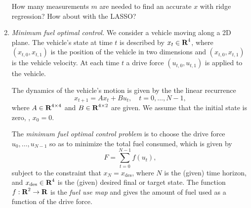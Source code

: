 \documentclass[12pt]{article}
\begin{document}
\begin{enumerate}
How many measurements $m$ are needed to find an accurate $x$ with ridge regression? How about with the LASSO?





\item \emph{Minimum fuel optimal control.}
We consider a vehicle moving along a 2D plane. The vehicle's state at time $t$ is described by $x_t \in {\mbox{\bf R}}^4$, where $(x_{t,0}, x_{t,1})$ is the position of the vehicle in two dimensions and $(x_{t,0}, x_{t,1})$ is the vehicle velocity. At each time $t$ a drive force $(u_{t,0}, u_{t,1})$ is applied to the vehicle.

The dynamics of the vehicle's motion is given by the the linear recurrence
\[
x_{t+1} = Ax_t + Bu_t, \quad t=0, \ldots, N-1,
\]
where $A \in {\mbox{\bf R}}^{4 \times 4}$ and $B \in {\mbox{\bf R}}^{4 \times 2}$ are given. We assume that the initial state is zero, \ie, $x_0 = 0$.

The \emph{minimum fuel optimal control problem}
is to choose the drive force $u_0, \ldots, u_{N-1}$ so as to
minimize the total fuel consumed, which is given by
\[
F = \sum_{t=0}^{N-1} f(u_t),
\]
subject to the constraint that $x_N = x_\mathrm{des}$,
where $N$ is the (given) time horizon, and $x_\mathrm{des} \in {\mbox{\bf R}}^4$
is the (given) desired final or target state.
The function $f:{\mbox{\bf R}}^2 \rightarrow {\mbox{\bf R}}$ is the \emph{fuel use map} and gives the amount of fuel used as a function of the drive force.


\end{enumerate}
\end{document}
